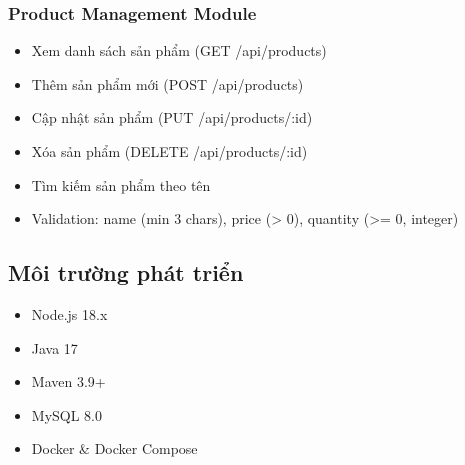 \subsubsection{Product Management Module}
\begin{itemize}
    \item Xem danh sách sản phẩm (GET /api/products)
    \item Thêm sản phẩm mới (POST /api/products)
    \item Cập nhật sản phẩm (PUT /api/products/:id)
    \item Xóa sản phẩm (DELETE /api/products/:id)
    \item Tìm kiếm sản phẩm theo tên
    \item Validation: name (min 3 chars), price (> 0), quantity (>= 0, integer)
\end{itemize}

\subsection{Môi trường phát triển}
\begin{itemize}
    \item Node.js 18.x
    \item Java 17
    \item Maven 3.9+
    \item MySQL 8.0
    \item Docker \& Docker Compose
\end{itemize}
